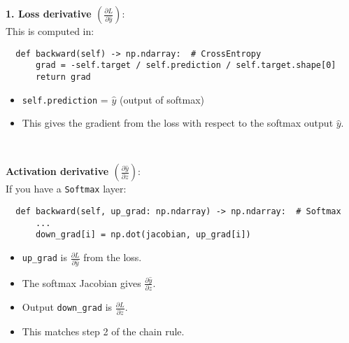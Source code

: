 \documentclass{article}
\newenvironment{cheatformula}[1][כותרת]{
    \begin{minipage}{\linewidth}
    \textbf{#1}: \\
}{
    \end{minipage}\\[0ex]
}
\begin{document}
  \begin{cheatformula}[1. Loss derivative $\left(\frac{\partial L}{\partial \hat{y}}\right)$]
  This is computed in:
  
  \begin{lstlisting}
  def backward(self) -> np.ndarray:  # CrossEntropy
      grad = -self.target / self.prediction / self.target.shape[0]
      return grad
  \end{lstlisting}
  
  \begin{itemize}
      \item \texttt{self.prediction} = $\hat{y}$ (output of softmax)
      \item This gives the gradient from the loss with respect to the softmax output $\hat{y}$.
  \end{itemize}
  \end{cheatformula}
  
  \begin{cheatformula}[Activation derivative $\left(\frac{\partial \hat{y}}{\partial z}\right)$]
  If you have a \texttt{Softmax} layer:
  
  \begin{lstlisting}
  def backward(self, up_grad: np.ndarray) -> np.ndarray:  # Softmax
      ...
      down_grad[i] = np.dot(jacobian, up_grad[i])
  \end{lstlisting}
  
  \begin{itemize}
      \item \texttt{up\_grad} is $\frac{\partial L}{\partial \hat{y}}$ from the loss.
      \item The softmax Jacobian gives $\frac{\partial \hat{y}}{\partial z}$.
      \item Output \texttt{down\_grad} is $\frac{\partial L}{\partial z}$.
      \item This matches step 2 of the chain rule.
  \end{itemize}
  \end{cheatformula}
  
\end{document}
